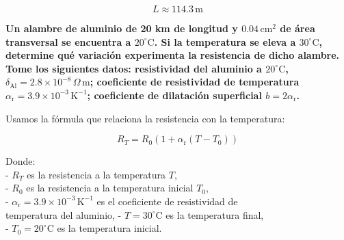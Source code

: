 \documentclass[answers]{exam} %
\begin{document}
\begin{questions}
	\[
		L \approx 114.3 \, \text{m}
	\]


	\question \textbf{Un alambre de aluminio de 20 km de longitud y \(0.04 \, \text{cm}^2\) de área transversal se encuentra a \(20^\circ \text{C}\). Si la temperatura se eleva a \(30^\circ \text{C}\), determine qué variación experimenta la resistencia de dicho alambre. Tome los siguientes datos: resistividad del aluminio a \(20^\circ \text{C}\), \(\delta_{\text{Al}} = 2.8 \times 10^{-8} \, \Omega \, \text{m}\); coeficiente de resistividad de temperatura \(\alpha_{\text{r}} = 3.9 \times 10^{-3} \, \text{K}^{-1}\); coeficiente de dilatación superficial \(b = 2\alpha_{\text{r}}\).}


	Usamos la fórmula que relaciona la resistencia con la temperatura:

	\[
		\boxed{R_T = R_0 \left( 1 + \alpha_{\text{r}} (T - T_0) \right)}
	\]

	Donde:\\
	- \(R_T\) es la resistencia a la temperatura \(T\),\\
	- \(R_0\) es la resistencia a la temperatura inicial \(T_0\),\\
	- \(\alpha_{\text{r}} = 3.9 \times 10^{-3} \, \text{K}^{-1}\) es el coeficiente de resistividad de \\temperatura del aluminio,
	- \(T = 30^\circ \text{C}\) es la temperatura final,\\
	- \(T_0 = 20^\circ \text{C}\) es la temperatura inicial.\\


\end{questions}
\end{document}
